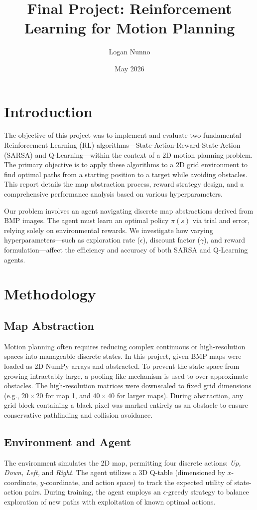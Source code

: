 \documentclass{article}
\title{Final Project: Reinforcement Learning for Motion Planning}
\author{Logan Nunno}
\date{May 2026}
\begin{document}
\maketitle

\section{Introduction}
The objective of this project was to implement and evaluate two fundamental Reinforcement Learning (RL) algorithms—State-Action-Reward-State-Action (SARSA) and Q-Learning—within the context of a 2D motion planning problem. The primary objective is to apply these algorithms to a 2D grid environment to find optimal paths from a starting position to a target while avoiding obstacles. This report details the map abstraction process, reward strategy design, and a comprehensive performance analysis based on various hyperparameters.

Our problem involves an agent navigating discrete map abstractions derived from BMP images. The agent must learn an optimal policy $\pi(s)$ via trial and error, relying solely on environmental rewards. We investigate how varying hyperparameters—such as exploration rate ($\epsilon$), discount factor ($\gamma$), and reward formulation—affect the efficiency and accuracy of both SARSA and Q-Learning agents.

\section{Methodology}
\subsection{Map Abstraction}
Motion planning often requires reducing complex continuous or high-resolution spaces into manageable discrete states. In this project, given BMP maps were loaded as 2D NumPy arrays and abstracted. To prevent the state space from growing intractably large, a pooling-like mechanism is used to over-approximate obstacles. The high-resolution matrices were downscaled to fixed grid dimensions (e.g., $20 \times 20$ for map 1, and $40 \times 40$ for larger maps). During abstraction, any grid block containing a black pixel was marked entirely as an obstacle to ensure conservative pathfinding and collision avoidance.

\subsection{Environment and Agent}
The environment simulates the 2D map, permitting four discrete actions: \textit{Up, Down, Left,} and \textit{Right}. The agent utilizes a 3D Q-table (dimensioned by $x$-coordinate, $y$-coordinate, and action space) to track the expected utility of state-action pairs. During training, the agent employs an $\epsilon$-greedy strategy to balance exploration of new paths with exploitation of known optimal actions.
\end{document}
